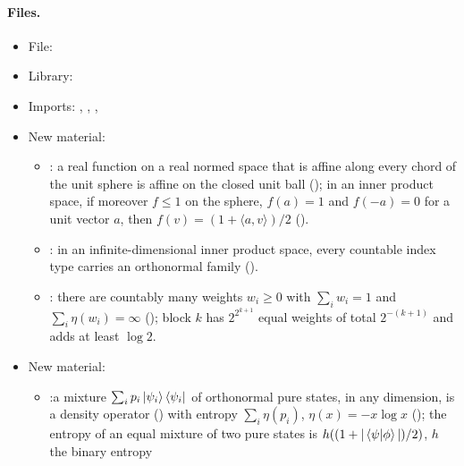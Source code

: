 \documentclass[11pt]{article}
\begin{document}
\paragraph{Files.}\leavevmode
\begin{itemize}
\item File: 
\item Library: 
\item Imports: ,
  ,
  ,
\item New  material:
\begin{itemize}
\item {}: a real function on a real normed space
  that is affine along every chord of the unit sphere is affine on the closed unit ball
  (); in an inner product space, if moreover $f \le 1$ on the
  sphere, $f(a) = 1$ and $f(-a) = 0$ for a unit vector $a$, then
  $f(v) = (1 + \langle a, v\rangle)/2$ ().
\item {}: in an
  infinite-dimensional inner product space, every countable index type carries an orthonormal
  family ().
\item {}: there are countably many
  weights $w_i \ge 0$ with $\sum_i w_i = 1$ and $\sum_i \eta(w_i) = \infty$
  (); block $k$ has $2^{2^{k+1}}$ equal
  weights of total $2^{-(k+1)}$ and adds at least $\log 2$.
\end{itemize}
\item New  material:
\begin{itemize}
\item {}:\newline a mixture
  $\sum_i p_i\ket{\psi_i}\bra{\psi_i}$ of orthonormal pure states, in any dimension, is a density
  operator () with entropy $\sum_i \eta(p_i)$,
  $\eta(x) = -x\log x$ (); the entropy of an equal mixture
  of two pure states is $h((1 + |\braket{\psi|\phi}|)/2)$, $h$ the binary entropy

\end{itemize}
\end{itemize}
\end{document}
